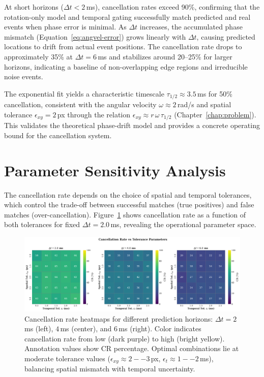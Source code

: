 At short horizons ($\Delta t < 2$\,ms), cancellation rates exceed 90\%, confirming that the rotation-only model and temporal gating successfully match predicted and real events when phase error is minimal. As $\Delta t$ increases, the accumulated phase mismatch (Equation~\eqref{eq:angvel-error}) grows linearly with $\Delta t$, causing predicted locations to drift from actual event positions. The cancellation rate drops to approximately 35\% at $\Delta t=6$\,ms and stabilizes around 20--25\% for larger horizons, indicating a baseline of non-overlapping edge regions and irreducible noise events.

The exponential fit yields a characteristic timescale $\tau_{1/2} \approx 3.5$\,ms for 50\% cancellation, consistent with the angular velocity $\omega \approx 2$\,rad/s and spatial tolerance $\epsilon_{xy}=2$\,px through the relation $\epsilon_{xy} \approx r\,\omega\,\tau_{1/2}$ (Chapter~\ref{chap:problem}). This validates the theoretical phase-drift model and provides a concrete operating bound for the cancellation system.

\section{Parameter Sensitivity Analysis}

The cancellation rate depends on the choice of spatial and temporal tolerances, which control the trade-off between successful matches (true positives) and false matches (over-cancellation). Figure~\ref{fig:tolerance_heatmap} shows cancellation rate as a function of both tolerances for fixed $\Delta t=2.0$\,ms, revealing the operational parameter space.

\begin{figure}[t]
  \centering
  \includegraphics[width=0.95\linewidth]{../code/thesis_figures/figure_tolerance_sensitivity.pdf}
  \caption{Cancellation rate heatmaps for different prediction horizons: $\Delta t = 2$\,ms (left), $4$\,ms (center), and $6$\,ms (right). Color indicates cancellation rate from low (dark purple) to high (bright yellow). Annotation values show CR percentage. Optimal combinations lie at moderate tolerance values ($\epsilon_{xy} \approx 2--3$\,px, $\epsilon_t \approx 1--2$\,ms), balancing spatial mismatch with temporal uncertainty.}
  \label{fig:tolerance_heatmap}
\end{figure}

